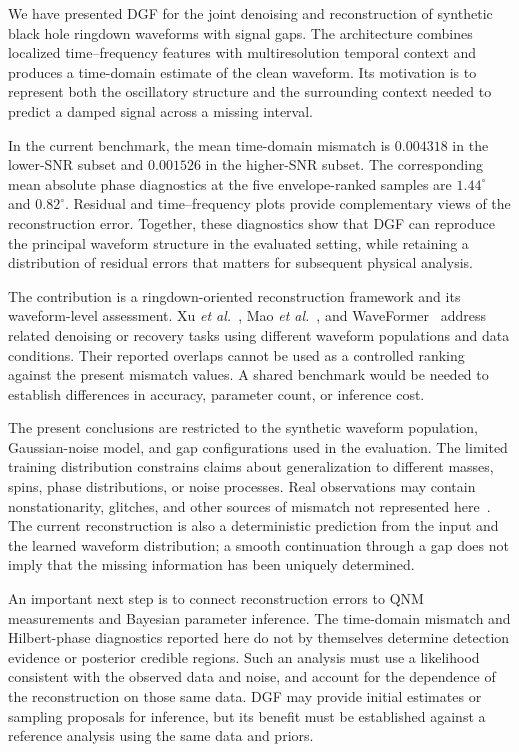 \documentclass[prd,aps,a4paper,twocolumn,superscriptaddress,nofootinbib,floatfix]{revtex4-2}
\begin{document}
We have presented DGF for the joint denoising and reconstruction of synthetic black hole ringdown waveforms with signal gaps. The architecture combines localized time--frequency features with multiresolution temporal context and produces a time-domain estimate of the clean waveform. Its motivation is to represent both the oscillatory structure and the surrounding context needed to predict a damped signal across a missing interval.

In the current benchmark, the mean time-domain mismatch is $0.004318$ in the lower-SNR subset and $0.001526$ in the higher-SNR subset. The corresponding mean absolute phase diagnostics at the five envelope-ranked samples are $1.44^\circ$ and $0.82^\circ$. Residual and time--frequency plots provide complementary views of the reconstruction error. Together, these diagnostics show that DGF can reproduce the principal waveform structure in the evaluated setting, while retaining a distribution of residual errors that matters for subsequent physical analysis.

The contribution is a ringdown-oriented reconstruction framework and its waveform-level assessment. Xu \textit{et al.}~\cite{Xu_2024}, Mao \textit{et al.}~\cite{Mao:2025cae}, and WaveFormer~\cite{Wang:2024waveformer} address related denoising or recovery tasks using different waveform populations and data conditions. Their reported overlaps cannot be used as a controlled ranking against the present mismatch values. A shared benchmark would be needed to establish differences in accuracy, parameter count, or inference cost.

The present conclusions are restricted to the synthetic waveform population, Gaussian-noise model, and gap configurations used in the evaluation. The limited training distribution constrains claims about generalization to different masses, spins, phase distributions, or noise processes. Real observations may contain nonstationarity, glitches, and other sources of mismatch not represented here~\cite{edwards2020nonstationary,baghi2019gaps}. The current reconstruction is also a deterministic prediction from the input and the learned waveform distribution; a smooth continuation through a gap does not imply that the missing information has been uniquely determined.

An important next step is to connect reconstruction errors to QNM measurements and Bayesian parameter inference. The time-domain mismatch and Hilbert-phase diagnostics reported here do not by themselves determine detection evidence or posterior credible regions. Such an analysis must use a likelihood consistent with the observed data and noise, and account for the dependence of the reconstruction on those same data. DGF may provide initial estimates or sampling proposals for inference, but its benefit must be established against a reference analysis using the same data and priors.
\end{document}
